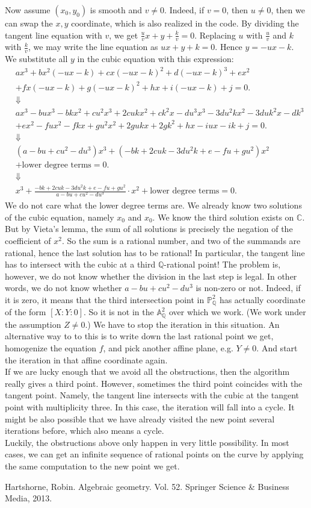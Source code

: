 \documentclass[a4paper,oneside,11pt]{article}
\newcommand{\bA}{\mathbb{A}}
\newcommand{\bC}{\mathbb{C}}
\newcommand{\bP}{\mathbb{P}}
\newcommand{\bQ}{\mathbb{Q}}
\theoremstyle{definition}
\begin{document}
Now assume $(x_0,y_0)$ is smooth and $v\neq 0$. Indeed, if $v=0$, then $u\neq0$, then we can swap the $x,y$ coordinate, which is also realized in the code. By dividing the tangent line equation with $v$, we get $\frac{u}{v}x+y+\frac{k}{v}=0$. Replacing $u$ with $\frac{u}{v}$ and $k$ with $\frac{k}{v}$, we may write the line equation as $ux+y+k=0$. Hence $y=-ux-k$. We substitute all $y$ in the cubic equation with this expression:
\begin{align*}
	&ax^3+bx^2(-ux-k)+cx(-ux-k)^2+d(-ux-k)^3+ex^2\\&+fx(-ux-k)+g(-ux-k)^2+hx+i(-ux-k)+j=0. \\ &\Downarrow\\
	&ax^3-bux^3-bkx^2+cu^2x^3+2cukx^2+ck^2x-du^3x^3-3du^2kx^2-3duk^2x-dk^3\\&+ex^2-fux^2-fkx+gu^2x^2+2gukx+2gk^2+hx-iux-ik+j=0.\\ &\Downarrow\\
	&(a-bu+cu^2-du^3)x^3+(-bk+2cuk-3du^2k+e-fu+gu^2)x^2\\&+ \text{lower degree terms}=0.\\ &\Downarrow\\
	&x^3+\frac{-bk+2cuk-3du^2k+e-fu+gu^2}{a-bu+cu^2-du^3}\cdot x^2+ \text{lower degree terms}=0.
\end{align*}
We do not care what the lower degree terms are. We already know two solutions of the cubic equation, namely $x_0$ and $x_0$. We know the third solution exists on $\bC$. But by Vieta's lemma, the sum of all solutions is precisely the negation of the coefficient of $x^2$. So the sum is a rational number, and two of the summands are rational, hence the last solution has to be rational! In particular, the tangent line has to intersect with the cubic at a third $\bQ$-rational point!
The problem is, however, we do not know whether the division in the last step is legal. In other words, we do not know whether $a-bu+cu^2-du^3$ is non-zero or not. Indeed, if it is zero, it means that the third intersection point in $\bP^2_\bQ$ has actually coordinate of the form $[X:Y:0]$. So it is not in the $\bA^2_\bQ$ over which we work. (We work under the assumption $Z\neq 0$.) We have to stop the iteration in this situation. An alternative way to to this is to write down the last rational point we get, homogenize the equation $f$, and pick another affine plane, e.g. $Y\neq 0$. And start the iteration in that affine coordinate again.\\
If we are lucky enough that we avoid all the obstructions, then the algorithm really gives a third point. However, sometimes the third point coincides with the tangent point. Namely, the tangent line intersects with the cubic at the tangent point with multiplicity three. In this case, the iteration will fall into a cycle. It might be also possible that we have already visited the new point several iterations before, which also means a cycle.\\
Luckily, the obstructions above only happen in very little possibility. In most cases, we can get an infinite sequence of rational points on the curve by applying the same computation to the new point we get.

\begin{thebibliography}{99}
	 Hartshorne, Robin. Algebraic geometry. Vol. 52. Springer Science \& Business Media, 2013.
\end{thebibliography}
\end{document}
